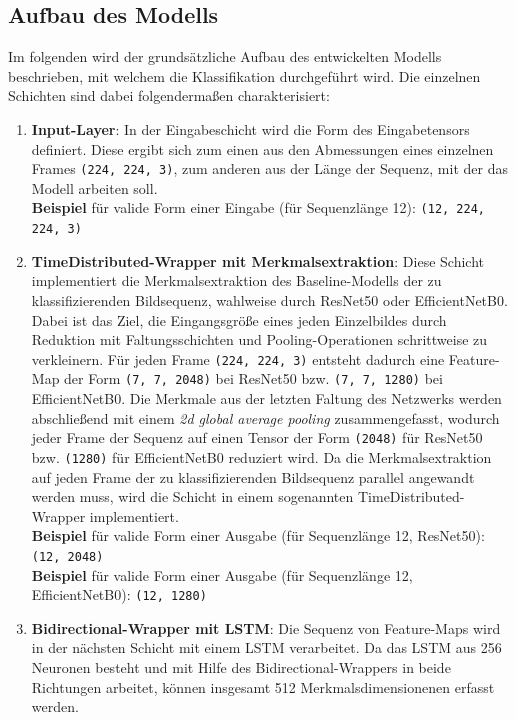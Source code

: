 \documentclass{article}
\newcommand{\imgsize}{\texttt{(224, 224, 3)}\xspace}
\newcommand{\resnet}{ResNet50\xspace}
\newcommand{\effnet}{EfficientNetB0\xspace}
\begin{document}
\subsection{Aufbau des Modells}\label{ssec:model}
Im folgenden wird der grundsätzliche Aufbau des entwickelten Modells beschrieben, mit welchem die Klassifikation durchgeführt wird.
Die einzelnen Schichten sind dabei folgendermaßen charakterisiert:
\begin{enumerate}
    \item\textbf{Input-Layer}:
        In der Eingabeschicht wird die Form des Eingabetensors definiert.
        Diese ergibt sich zum einen aus den Abmessungen eines einzelnen Frames \imgsize, zum anderen aus der Länge der Sequenz, mit der das Modell arbeiten soll.
        \\\textbf{Beispiel} für valide Form einer Eingabe (für Sequenzlänge 12): \texttt{(12, 224, 224, 3)}
    \item\textbf{TimeDistributed-Wrapper mit Merkmalsextraktion}:
        Diese Schicht implementiert die Merkmalsextraktion des Baseline-Modells der zu klassifizierenden Bildsequenz, wahlweise durch \resnet oder \effnet.
        Dabei ist das Ziel, die Eingangsgröße eines jeden Einzelbildes durch Reduktion mit Faltungsschichten und Pooling-Operationen schrittweise zu verkleinern.
        Für jeden Frame \imgsize entsteht dadurch eine Feature-Map der Form \texttt{(7, 7, 2048)} bei \resnet bzw. \texttt{(7, 7, 1280)} bei \effnet.
        Die Merkmale aus der letzten Faltung des Netzwerks werden abschließend mit einem \textit{2d global average pooling} zusammengefasst, wodurch jeder Frame der Sequenz auf einen Tensor der Form \texttt{(2048)} für \resnet bzw. \texttt{(1280)} für \effnet reduziert wird.
        Da die Merkmalsextraktion auf jeden Frame der zu klassifizierenden Bildsequenz parallel angewandt werden muss, wird die Schicht in einem sogenannten TimeDistributed-Wrapper implementiert.
        \\\textbf{Beispiel} für valide Form einer Ausgabe (für Sequenzlänge 12, \resnet): \texttt{(12, 2048)}
        \\\textbf{Beispiel} für valide Form einer Ausgabe (für Sequenzlänge 12, \effnet): \texttt{(12, 1280)}
    \item\textbf{Bidirectional-Wrapper mit LSTM}:
        Die Sequenz von Feature-Maps wird in der nächsten Schicht mit einem LSTM verarbeitet.
        Da das LSTM aus 256 Neuronen besteht und mit Hilfe des Bidirectional-Wrappers in beide Richtungen arbeitet, können insgesamt 512 Merkmalsdimensionenen erfasst werden.

\end{enumerate}
\end{document}
